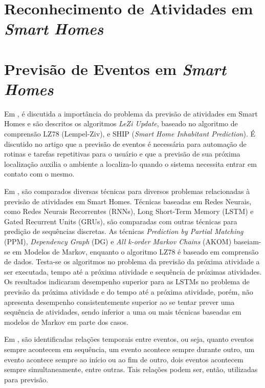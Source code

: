 \documentclass[
	12pt,				%
	openright,			%
	twoside,			%
	a4paper,			%
	english,			%
	spanish,			%
	brazil,				%
	]{abntex2}\usepackage[]{graphicx}\usepackage[]{color}
\begin{document}
\section{Reconhecimento de Atividades em \textit{Smart Homes}}


\section{Previsão de Eventos em \textit{Smart Homes}}

Em \cite{The role of prediction algorithms in the MavHome smart home architecture}, é discutida a importância do problema da previsão de atividades em Smart Homes e são descritos os algoritmos \textit{LeZi Update}, baseado no algoritmo de comprensão LZ78 (Lempel-Ziv), e SHIP (\textit{Smart Home Inhabitant Prediction}). É discutido no artigo que a previsão de eventos é necessária para automação de rotinas e tarefas repetitivas para o usuário e que a previsão de sua próxima localização auxilia o ambiente a localiza-lo quando o sistema necessita entrar em contato com o mesmo.

Em \cite{Human Activity Prediction in Smart Home Environments with LSTM Neural Networks}, são comparados diversas técnicas para diversos problemas relacionadas à previsão de atividades em Smart Homes. Técnicas baseadas em Redes Neurais, como Redes Neurais Recorrentes (RNNs), Long Short-Term Memory (LSTM) e Gated Recurrent Units (GRUs), são comparadas com outras técnicas para predição de sequências discretas. As técnicas \textit{Prediction by Partial Matching} (PPM), \textit{Dependency Graph} (DG) e \textit{All k-order Markov Chains} (AKOM) baseiam-se em Modelos de Markov, enquanto o algoritmo LZ78 é baseado em comprensão de dados. Testa-se os algoritmos no problema da previsão da próxima atividade a ser executada, tempo até a próxima atividade e sequência de próximas atividades. Os resultados indicaram desempenho superior para as LSTMs no problema de previsão da próxima atividade e do tempo até a próxima atividade, porém, não apresenta desempenho consistentemente superior ao se tentar prever uma sequência de atividades, sendo inferior a uma ou mais técnicas baseadas em modelos de Markov em parte dos casos.

Em \cite{Using Temporal Relations in Smart Environment Data for Activity Prediction}, são identificadas relações temporais entre eventos, ou seja, quanto eventos sempre acontecem em sequência, um evento acontece sempre durante outro, um evento acontece sempre ao início ou ao fim de outro, dois eventos acontecem sempre simultaneamente, entre outras. Tais relações podem ser, então, utilizadas para previsão.
\end{document}
